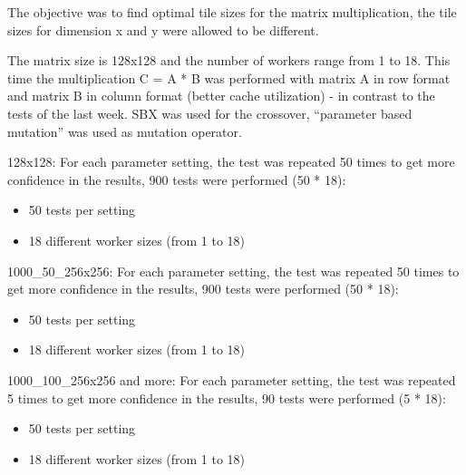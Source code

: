 \documentclass{article}
\begin{document}
The objective was to find optimal tile sizes for the matrix multiplication, the tile sizes for dimension x and y were allowed to be different.

The matrix size is 128x128 and the number of workers range from 1 to 18. This time the multiplication C = A * B was performed with matrix A in row format and matrix B in column format (better cache utilization) - in contrast to the tests of the last week. SBX was used for the crossover, ``parameter based mutation'' was used as mutation operator.

128x128: For each parameter setting, the test was repeated 50 times to get more confidence in the results, 900 tests were performed (50 * 18):
\begin{itemize}
  \item 50 tests per setting
  \item 18 different worker sizes (from 1 to 18)
\end{itemize}

1000\_50\_256x256: For each parameter setting, the test was repeated 50 times to get more confidence in the results, 900 tests were performed (50 * 18):
\begin{itemize}
  \item 50 tests per setting
  \item 18 different worker sizes (from 1 to 18)
\end{itemize}

1000\_100\_256x256 and more: For each parameter setting, the test was repeated 5 times to get more confidence in the results, 90 tests were performed (5 * 18):
\begin{itemize}
  \item 50 tests per setting
  \item 18 different worker sizes (from 1 to 18)
\end{itemize}
\end{document}
